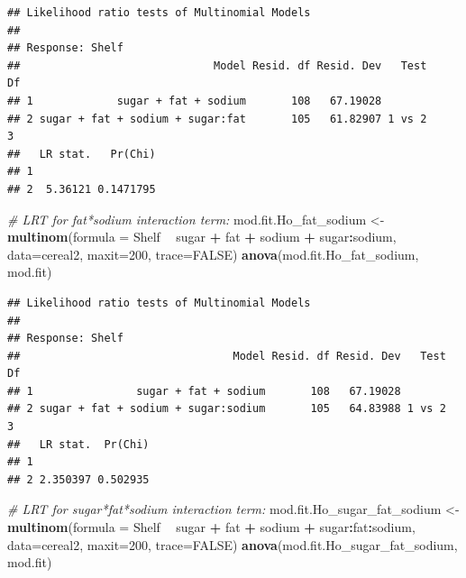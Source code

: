 \documentclass[11pt,]{article}
\newenvironment{Shaded}{\begin{snugshade}}{\end{snugshade}}
\newcommand{\KeywordTok}[1]{\textcolor[rgb]{0.13,0.29,0.53}{\textbf{#1}}}
\newcommand{\DataTypeTok}[1]{\textcolor[rgb]{0.13,0.29,0.53}{#1}}
\newcommand{\DecValTok}[1]{\textcolor[rgb]{0.00,0.00,0.81}{#1}}
\newcommand{\StringTok}[1]{\textcolor[rgb]{0.31,0.60,0.02}{#1}}
\newcommand{\CommentTok}[1]{\textcolor[rgb]{0.56,0.35,0.01}{\textit{#1}}}
\newcommand{\OtherTok}[1]{\textcolor[rgb]{0.56,0.35,0.01}{#1}}
\newcommand{\OperatorTok}[1]{\textcolor[rgb]{0.81,0.36,0.00}{\textbf{#1}}}
\newcommand{\NormalTok}[1]{#1}
\begin{document}
\begin{verbatim}
## Likelihood ratio tests of Multinomial Models
## 
## Response: Shelf
##                              Model Resid. df Resid. Dev   Test    Df
## 1             sugar + fat + sodium       108   67.19028             
## 2 sugar + fat + sodium + sugar:fat       105   61.82907 1 vs 2     3
##   LR stat.   Pr(Chi)
## 1                   
## 2  5.36121 0.1471795
\end{verbatim}

\begin{Shaded}
\begin{Highlighting}[]
\CommentTok{# LRT for fat*sodium interaction term:}
\NormalTok{mod.fit.Ho_fat_sodium <-}\StringTok{ }\KeywordTok{multinom}\NormalTok{(}\DataTypeTok{formula =}\NormalTok{ Shelf }\OperatorTok{~}\StringTok{ }\NormalTok{sugar }\OperatorTok{+}\StringTok{ }\NormalTok{fat }\OperatorTok{+}\StringTok{ }\NormalTok{sodium }\OperatorTok{+}\StringTok{ }\NormalTok{sugar}\OperatorTok{:}\NormalTok{sodium, }\DataTypeTok{data=}\NormalTok{cereal2, }\DataTypeTok{maxit=}\DecValTok{200}\NormalTok{, }\DataTypeTok{trace=}\OtherTok{FALSE}\NormalTok{)}
\KeywordTok{anova}\NormalTok{(mod.fit.Ho_fat_sodium, mod.fit)  }
\end{Highlighting}
\end{Shaded}

\begin{verbatim}
## Likelihood ratio tests of Multinomial Models
## 
## Response: Shelf
##                                 Model Resid. df Resid. Dev   Test    Df
## 1                sugar + fat + sodium       108   67.19028             
## 2 sugar + fat + sodium + sugar:sodium       105   64.83988 1 vs 2     3
##   LR stat.  Pr(Chi)
## 1                  
## 2 2.350397 0.502935
\end{verbatim}

\begin{Shaded}
\begin{Highlighting}[]
\CommentTok{# LRT for sugar*fat*sodium interaction term:}
\NormalTok{mod.fit.Ho_sugar_fat_sodium <-}\StringTok{ }\KeywordTok{multinom}\NormalTok{(}\DataTypeTok{formula =}\NormalTok{ Shelf }\OperatorTok{~}\StringTok{ }\NormalTok{sugar }\OperatorTok{+}\StringTok{ }\NormalTok{fat }\OperatorTok{+}\StringTok{ }\NormalTok{sodium }\OperatorTok{+}\StringTok{ }\NormalTok{sugar}\OperatorTok{:}\NormalTok{fat}\OperatorTok{:}\NormalTok{sodium, }\DataTypeTok{data=}\NormalTok{cereal2, }\DataTypeTok{maxit=}\DecValTok{200}\NormalTok{, }\DataTypeTok{trace=}\OtherTok{FALSE}\NormalTok{)}
\KeywordTok{anova}\NormalTok{(mod.fit.Ho_sugar_fat_sodium, mod.fit)  }
\end{Highlighting}
\end{Shaded}
\end{document}
